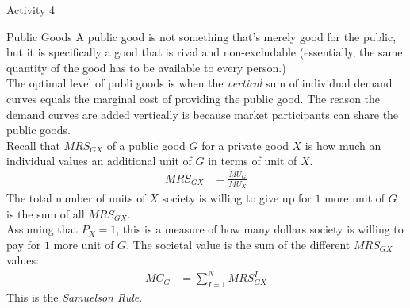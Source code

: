 \documentclass[10pt]{extarticle}
\begin{document}
  \begin{problem}{Activity 4}
    \begin{tcbraster}[raster columns = 1,colframe = black!75!white,colback=white]
    \end{tcbraster}
  \end{problem}
  \begin{problem}{Public Goods}
    A public good is not something that's merely good for the public, but it is specifically a good that is rival and non-excludable (essentially, the same quantity of the good has to be available to every person.)\\

    The optimal level of publi goods is when the \textit{vertical} sum of individual demand curves equals the marginal cost of providing the public good. The reason the demand curves are added vertically is because market participants can share the public goods.\\

    Recall that $MRS_{GX}$ of a public good $G$ for a private good $X$ is how much an individual values an additional unit of $G$ in terms of unit of $X$.
    \begin{align*}
      MRS_{GX} &= \frac{MU_G}{MU_X}
    \end{align*}
    The total number of units of $X$ society is willing to give up for $1$ more unit of $G$ is the sum of all $MRS_{GX}$.\\

    Assuming that $P_X = 1$, this is a measure of how many dollars society is willing to pay for $1$ more unit of $G$. The societal value is the sum of the different $MRS_{GX}$ values:
    \begin{align*}
      MC_G &= \sum_{I=1}^{N} MRS_{GX}^I
    \end{align*}
    This is the \textit{Samuelson Rule}.
  \end{problem}
\end{document}
